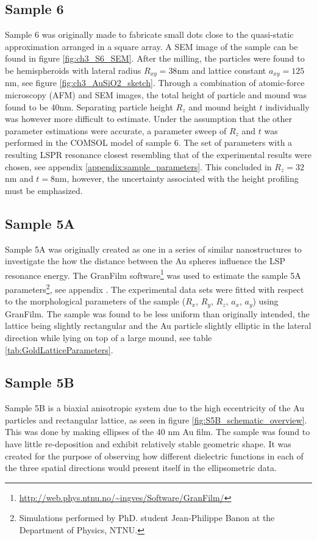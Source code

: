 \subsection{Sample 6}
Sample 6 was originally made to fabricate small dots close to the quasi-static approximation arranged in a square array. A SEM image of the sample can be found in figure \ref{fig:ch3_S6_SEM}. After the milling, the particles were found to be hemispheroids with lateral radius $R_{xy} = 38$nm and lattice constant $a_{xy} = 125$nm, see figure \ref{fig:ch3_AuSiO2_sketch}. Through a combination of atomic-force microscopy (AFM) and SEM images, the total height of particle and mound was found to be 40nm. Separating particle height $R_z$ and mound height $t$ individually was however more difficult to estimate. Under the assumption that the other parameter estimations were accurate, a parameter sweep of $R_z$ and $t$ was performed in the COMSOL model of sample 6. The set of parameters with a resulting LSPR resonance closest resembling that of the experimental results were chosen, see appendix \ref{appendix:sample_parameters}. This concluded in $R_z=32$nm and $t=8$nm, however, the uncertainty associated with the height profiling must be emphasized.

\subsection{Sample 5A}
Sample 5A was originally created as one in a series of similar nanostructures to investigate the how the distance between the Au spheres influence the LSP resonance energy. The GranFilm software\footnote{\url{http://web.phys.ntnu.no/~ingves/Software/GranFilm/}} was used to estimate the sample 5A parameters\footnote{Simulations performed by PhD. student Jean-Philippe Banon at the Department of Physics, NTNU.}, see appendix . The experimental data sets were fitted with respect to the morphological parameters of the sample ($R_x$, $R_y$, $R_z$, $a_x$, $a_y$) using GranFilm\cite{Kildemo2017}. The sample was found to be less uniform than originally intended, the lattice being slightly rectangular and the Au particle slightly elliptic in the lateral direction while lying on top of a large mound, see table \ref{tab:GoldLatticeParameters}. 

\subsection{Sample 5B}
\label{sec:ch3_sample5B}
Sample 5B is a biaxial anisotropic system due to the high eccentricity of the Au particles and rectangular lattice, as seen in figure \ref{fig:S5B_schematic_overview}. This was done by making ellipses of the 40 nm Au film. The sample was found to have little re-deposition and exhibit relatively stable geometric shape\cite{brakstad_thesis}. It was created for the purpose of observing how different dielectric functions in each of the three spatial directions would present itself in the ellipsometric data. 

